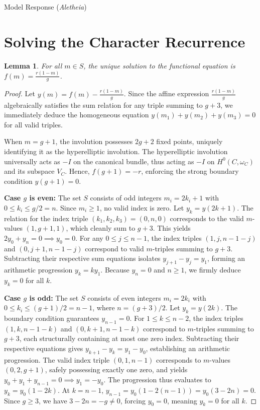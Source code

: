 \documentclass{article}
\theoremstyle{plain}
\newtheorem{lemma}{Lemma}
\theoremstyle{definition}
\newcommand{\Aletheia}{\emph{Aletheia}}
\begin{document}
\begin{solution}{Model Response (\Aletheia)}
\section{Solving the Character Recurrence}

\begin{lemma} \label{lem:recurrence_solution}
For all $m \in S$, the unique solution to the functional equation is $f(m) = \frac{r(1-m)}{g}$.
\end{lemma}

\begin{proof}
Let $y(m) = f(m) - \frac{r(1-m)}{g}$. Since the affine expression $\frac{r(1-m)}{g}$ algebraically satisfies the sum relation for any triple summing to $g+3$, we immediately deduce the homogeneous equation $y(m_1) + y(m_2) + y(m_3) = 0$ for all valid triples.

When $m = g+1$, the involution possesses $2g+2$ fixed points, uniquely identifying it as the hyperelliptic involution. The hyperelliptic involution universally acts as $-I$ on the canonical bundle, thus acting as $-I$ on $H^0(C, \omega_C)$ and its subspace $V_C$. Hence, $f(g+1) = -r$, enforcing the strong boundary condition $y(g+1) = 0$.

\textbf{Case $g$ is even:} The set $S$ consists of odd integers $m_i = 2k_i+1$ with $0 \le k_i \le g/2 = n$. Since $m_i \ge 1$, no valid index is zero. Let $y_k = y(2k+1)$. The relation for the index triple $(k_1, k_2, k_3) = (0, n, 0)$ corresponds to the valid $m$-values $(1, g+1, 1)$, which cleanly sum to $g+3$. This yields $2y_0 + y_n = 0 \implies y_0 = 0$. For any $0 \le j \le n-1$, the index triples $(1, j, n-1-j)$ and $(0, j+1, n-1-j)$ correspond to valid $m$-triples summing to $g+3$. Subtracting their respective sum equations isolates $y_{j+1} - y_j = y_1$, forming an arithmetic progression $y_k = k y_1$. Because $y_n = 0$ and $n \ge 1$, we firmly deduce $y_k = 0$ for all $k$.

\textbf{Case $g$ is odd:} The set $S$ consists of even integers $m_i = 2k_i$ with $0 \le k_i \le (g+1)/2 = n-1$, where $n = (g+3)/2$. Let $y_k = y(2k)$. The boundary condition guarantees $y_{n-1} = 0$. For $1 \le k \le n-2$, the index triples $(1, k, n-1-k)$ and $(0, k+1, n-1-k)$ correspond to $m$-triples summing to $g+3$, each structurally containing at most one zero index. Subtracting their respective equations gives $y_{k+1} - y_k = y_1 - y_0$, establishing an arithmetic progression. The valid index triple $(0, 1, n-1)$ corresponds to $m$-values $(0, 2, g+1)$, safely possessing exactly one zero, and yields $y_0 + y_1 + y_{n-1} = 0 \implies y_1 = -y_0$. The progression thus evaluates to $y_k = y_0(1-2k)$. At $k=n-1$, $y_{n-1} = y_0(1-2(n-1)) = y_0(3-2n) = 0$. Since $g \ge 3$, we have $3-2n = -g \neq 0$, forcing $y_0 = 0$, meaning $y_k = 0$ for all $k$.
\end{proof}


\end{solution}
\end{document}
